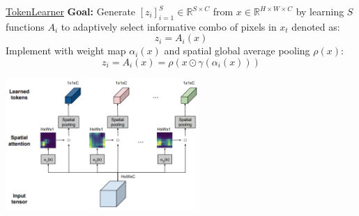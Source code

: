 \documentclass{beamer}
\begin{document}
\begin{frame}[t]{ \href{https://arxiv.org/pdf/2106.11297}{TokenLearner}}
    \vspace{-0.5em}
    \textbf{Goal:} Generate $\left[z_i\right]^S_{i=1} \in \mathbb{R}^{S \times C}$ from $x \in \mathbb{R}^{H \times W \times C}$
    by learning $S$ functions $A_i$ to adaptively select informative combo of pixels in $x_t$ denoted as:
    \[z_i = A_i(x)\]
    Implement with weight map $\alpha_i(x)$ and spatial global average pooling $\rho(x)$:
    \[z_i = A_i(x) = \rho(x \odot \gamma(\alpha_i(x)))\]
    \begin{center}
        \includegraphics[width=0.55\textwidth]{./img/tokenlearner.png}
    \end{center}
\end{frame}
\end{document}
